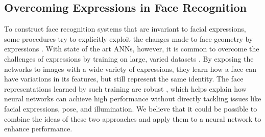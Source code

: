 \subsection{Overcoming Expressions in Face Recognition}

To construct face recognition systems that are invariant to facial expressions, some procedures try to explicitly exploit the changes made to face geometry by expressions \cite{exp_inv_1, exp_inv_2, exp_inv_3}. With state of the art ANNs, however, it is common to overcome the challenges of expressions by training on large, varied datasets \cite{facenet, deepface, deepid3}. By exposing the networks to images with a wide variety of expressions, they learn how a face can have variations in its features, but still represent the same identity. The face representations learned by such training are robust \cite{robust}, which helps explain how neural networks can achieve high performance without directly tackling issues like facial expressions, pose, and illumination. We believe that it could be possible to combine the ideas of these two approaches and apply them to a neural network to enhance performance. 


\cleardoublepage